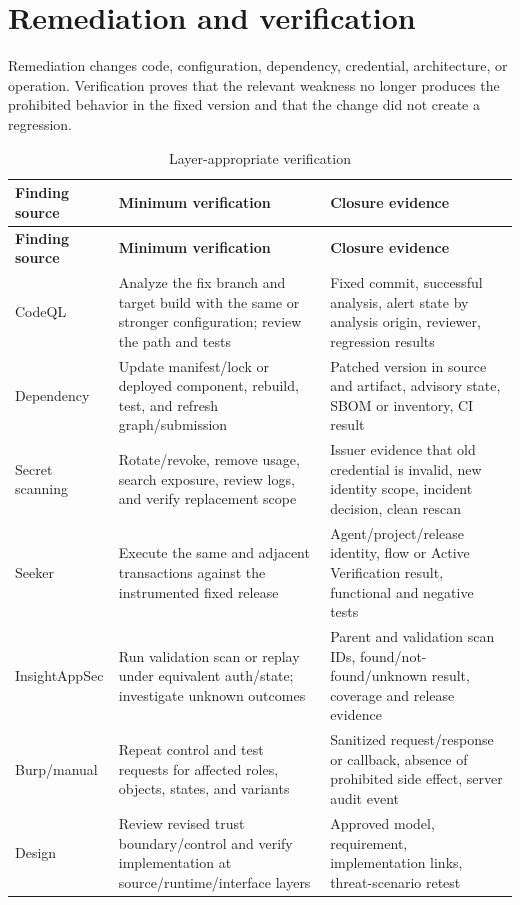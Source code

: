 \documentclass[11pt,letterpaper]{article}
\begin{document}
\section{Remediation and verification}

Remediation changes code, configuration, dependency, credential, architecture, or operation. Verification proves that the relevant weakness no longer produces the prohibited behavior in the fixed version and that the change did not create a regression.

\begin{longtable}{@{}L{1.35in}L{2.0in}L{3.2in}@{}}
\caption{Layer-appropriate verification}\label{tab:verification}\\
\toprule
\textbf{Finding source} & \textbf{Minimum verification} & \textbf{Closure evidence} \\
\midrule
\endfirsthead
\toprule
\textbf{Finding source} & \textbf{Minimum verification} & \textbf{Closure evidence} \\
\midrule
\endhead
CodeQL & Analyze the fix branch and target build with the same or stronger configuration; review the path and tests & Fixed commit, successful analysis, alert state by analysis origin, reviewer, regression results \\
Dependency & Update manifest/lock or deployed component, rebuild, test, and refresh graph/submission & Patched version in source and artifact, advisory state, SBOM or inventory, CI result \\
Secret scanning & Rotate/revoke, remove usage, search exposure, review logs, and verify replacement scope & Issuer evidence that old credential is invalid, new identity scope, incident decision, clean rescan \\
Seeker & Execute the same and adjacent transactions against the instrumented fixed release & Agent/project/release identity, flow or Active Verification result, functional and negative tests \\
InsightAppSec & Run validation scan or replay under equivalent auth/state; investigate unknown outcomes & Parent and validation scan IDs, found/not-found/unknown result, coverage and release evidence \\
Burp/manual & Repeat control and test requests for affected roles, objects, states, and variants & Sanitized request/response or callback, absence of prohibited side effect, server audit event \\
Design & Review revised trust boundary/control and verify implementation at source/runtime/interface layers & Approved model, requirement, implementation links, threat-scenario retest \\
\bottomrule
\end{longtable}
\end{document}
